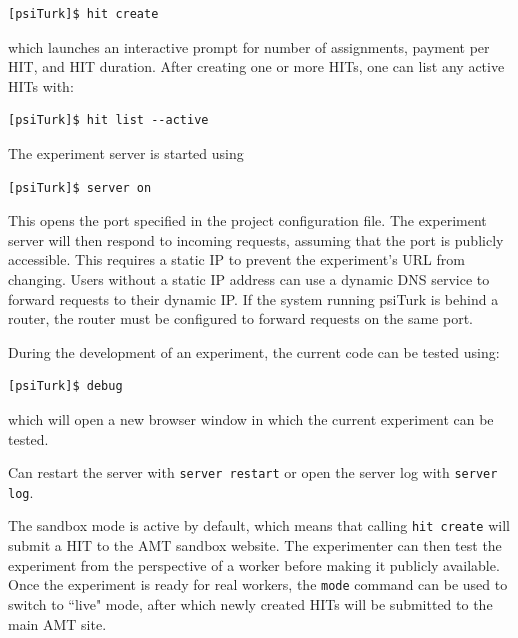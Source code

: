 \documentclass[twocolumn]{svjour3}          %
\begin{document}
\begin{lstlisting}
[psiTurk]$ hit create
\end{lstlisting}

\noindent which launches an interactive prompt for number of assignments, payment per HIT, and HIT duration. After creating one or more HITs, one can list any active HITs with:

\begin{lstlisting}
[psiTurk]$ hit list --active
\end{lstlisting}

The experiment server is started using

\begin{lstlisting}
[psiTurk]$ server on
\end{lstlisting}

\noindent This opens the port specified in the project configuration file.
The experiment server will then respond to incoming requests, assuming that the port is publicly accessible.
This requires a static IP to prevent the experiment's URL from changing.
Users without a static IP address can use a dynamic DNS service to forward requests to their dynamic IP.
If the system running psiTurk is behind a router, the router must be configured to forward requests on the same port.

During the development of an experiment, the current code can be tested using:

\begin{lstlisting}
[psiTurk]$ debug
\end{lstlisting}

\noindent which will open a new browser window in which the current experiment can be tested.

Can restart the server with \texttt{server restart} or open the server log with \texttt{server log}. 

The sandbox mode is active by default, which means that calling \texttt{hit create} will submit a HIT to the AMT sandbox website.
The experimenter can then test the experiment from the perspective of a worker before making it publicly available.
Once the experiment is ready for real workers, the \texttt{mode} command can be used to switch to ``live" mode, after which newly created HITs will be submitted to the main AMT site.
\end{document}
